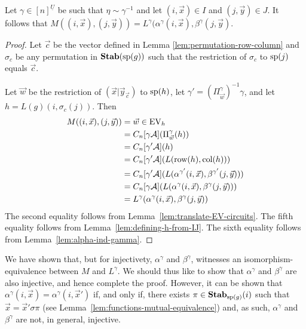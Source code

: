 \documentclass[../paper.tex]{subfiles}
\begin{document}
\begin{thm}
	Let $\gamma\in [n]^{\underline{U}}$ be such that $\eta \sim \gamma^{-1}$ and
  let $(i, \vec{x})\in I$ and $(j, \vec{y})\in J$. It follows that $M((i,
  \vec{x}), (j, \vec{y})) = L^{\gamma}(\alpha^{\gamma}(i, \vec{x}),
  \beta^{\gamma}(j, \vec{y})$.
	\label{lem:ML-equal-elements}
\end{thm}
\begin{proof}
	Let $\vec{c}$ be the vector defined in Lemma \ref{lem:permutation-row-column}
  and $\sigma_c$ be any permutation in $\text{\textbf{Stab}} (\text{sp} (g))$ such that the restriction of
  $\sigma_c$ to $\text{sp}(j)$ equals $\vec{c}$.
  
  Let $\vec{w}$ be the restriction of $(\vec{x} \vert \vec{y}_{\vec{c}})$ to
  $\text{sp}(h)$, let $\gamma' = (\Pi^{\gamma}_{\vec{w}})^{-1} \gamma$, and let $h
  = L(g)(i, \sigma_c(j))$. Then
	\begin{align*}
		M((i, \vec{x}), (j, \vec{y}))
    & = \vec{w} \in \text{EV}_h                                    \\
    & = C_n[\gamma \mathcal{A}] (\Pi^{\gamma}_{\vec{w}} (h)) \\
    & = C_n[\gamma' \mathcal{A}] (h)                                                             \\
    & = C_n[\gamma' \mathcal{A}](L(\text{row}(h), \text{col} (h)))                                        \\
    & = C_n[\gamma' \mathcal{A}](L(\alpha^{\gamma'}(i, \vec{x}), \beta^{\gamma'}(j, \vec{y})))   \\
    & = C_n[\gamma \mathcal{A}](L(\alpha^{\gamma}(i, \vec{x}), \beta^{\gamma}(j, \vec{y})))     \\
    & = L^{\gamma}(\alpha^{\gamma}(i, \vec{x}), \beta^{\gamma}(j, \vec{y}))                      
	\end{align*}
	The second equality follows from Lemma~\ref{lem:translate-EV-circuits}. The
  fifth equality follows from Lemma~\ref{lem:defining-h-from-IJ}. The sixth
  equality follows from Lemma~\ref{lem:alpha-ind-gamma}.
\end{proof}

We have shown that, but for injectivety, $\alpha^{\gamma}$ and $\beta^{\gamma}$,
witnesses an isomorphism-equivalence between $M$ and $L^{\gamma}$. We should
thus like to show that $\alpha^{\gamma}$ and $\beta^{\gamma}$ are also
injective, and hence complete the proof. However, it can be shown that
$\alpha^{\gamma}(i, \vec{x}) = \alpha^{\gamma}(i, \vec{x}')$ if, and only if,
there exists $\pi \in \text{\textbf{Stab}}_{\text{sp}(g)}(i)$ such that $\vec{x} = \vec{x}'\sigma
\pi$ (see Lemma~\ref{lem:functions-mutual-equivalence}) and, as such,
$\alpha^{\gamma}$ and $\beta^{\gamma}$ are not, in general, injective.
\end{document}
